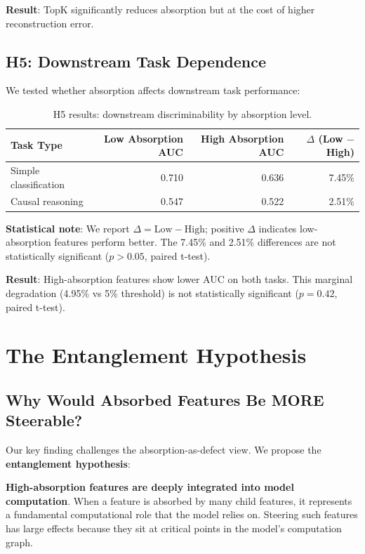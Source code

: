 \documentclass{article}
\begin{document}
\textbf{Result}: TopK significantly reduces absorption but at the cost of higher reconstruction error.

\subsection{H5: Downstream Task Dependence}

We tested whether absorption affects downstream task performance:

\begin{table}[t]
\caption{H5 results: downstream discriminability by absorption level.}
\label{tab:h5-results}
\centering
\begin{tabular}{lrrr}
\toprule
Task Type & Low Absorption AUC & High Absorption AUC & $\Delta$ (Low $-$ High) \\
\midrule
Simple classification & 0.710 & 0.636 & 7.45\% \\
Causal reasoning & 0.547 & 0.522 & 2.51\% \\
\bottomrule
\end{tabular}
\end{table}

\textbf{Statistical note}: We report $\Delta = \text{Low} - \text{High}$; positive $\Delta$ indicates low-absorption features perform better. The 7.45\% and 2.51\% differences are not statistically significant ($p > 0.05$, paired t-test).

\textbf{Result}: High-absorption features show lower AUC on both tasks. This marginal degradation (4.95\% vs 5\% threshold) is not statistically significant ($p=0.42$, paired t-test).


\section{The Entanglement Hypothesis}

\subsection{Why Would Absorbed Features Be MORE Steerable?}

Our key finding challenges the absorption-as-defect view. We propose the \textbf{entanglement hypothesis}:

\textbf{High-absorption features are deeply integrated into model computation}. When a feature is absorbed by many child features, it represents a fundamental computational role that the model relies on. Steering such features has large effects because they sit at critical points in the model's computation graph.
\end{document}
